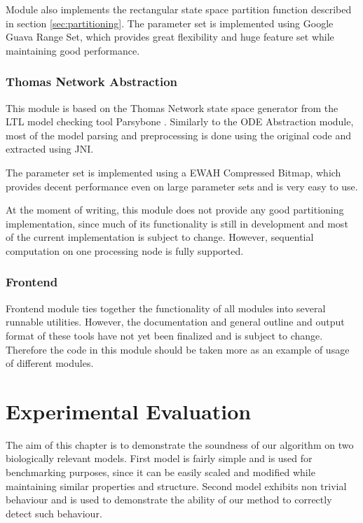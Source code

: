 \documentclass[12pt,oneside]{fithesis2}
\begin{document}
			Module also implements the rectangular state space partition function described in section \ref{sec:partitioning}. The parameter set is implemented using Google Guava Range Set, which provides great flexibility and huge feature set while maintaining good performance.
				
		\subsection{Thomas Network Abstraction}

			This module is based on the Thomas Network state space generator from the LTL model checking tool Parsybone \cite{parsybone}. Similarly to the ODE Abstraction module, most of the model parsing and preprocessing is done using the original code and extracted using JNI. 
				
			The parameter set is implemented using a EWAH Compressed Bitmap, which provides decent performance even on large parameter sets and is very easy to use. 
				
			At the moment of writing, this module does not provide any good partitioning implementation, since much of its functionality is still in development and most of the current implementation is subject to change. However, sequential computation on one processing node is fully supported.
				
		\subsection{Frontend}			
			
			Frontend module ties together the functionality of all modules into several runnable utilities. However, the documentation and general outline and output format of these tools have not yet been finalized and is subject to change. Therefore the code in this module should be taken more as an example of usage of different modules.	
				
	\chapter{Experimental Evaluation}

			The aim of this chapter is to demonstrate the soundness of our algorithm on two biologically relevant models. First model is fairly simple and is used for benchmarking purposes, since it can be easily scaled and modified while maintaining similar properties and structure. Second model exhibits non trivial behaviour and is used to demonstrate the ability of our method to correctly detect such behaviour. 
		
\end{document}
